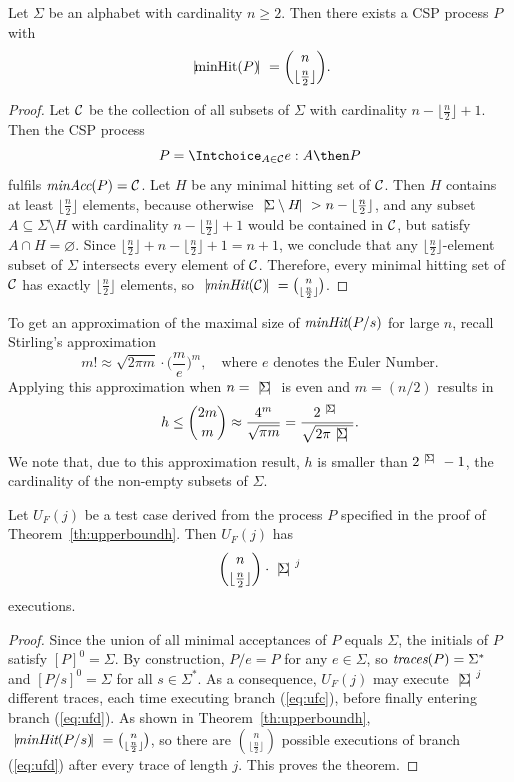 \begin{theorem}
\label{th:upperboundh}
Let  $\Sigma$  be an alphabet with cardinality $n\ge 2$.  Then
there exists a CSP process $P$ with
\[
{~|\! \text{minHit}(P)\!|~} = \binom{n}{\lfloor\frac{n}{2}\rfloor}.
\]
\end{theorem}
\begin{proof}
Let ${\cal C}$ be the collection of all subsets of $\Sigma$ with cardinality
$n-\lfloor{\frac{n}{2}}\rfloor+1$. Then the CSP process
\[
P = \Intchoice_{A\in {\cal C}} e:A\then P
\]
fulfils $\text{\it minAcc}(P) = {\cal C}$. Let $H$ be any minimal hitting set of ${\cal C}$. Then
$H$ contains at least $\lfloor{\frac{n}{2}}\rfloor$ elements, because
otherwise ${~|\! \Sigma\setminus H\!|~} > n-\lfloor{\frac{n}{2}}\rfloor$, and any
subset $A\subseteq \Sigma\setminus H$ with cardinality
$n-\lfloor{\frac{n}{2}}\rfloor+1$  would be contained in ${\cal C}$, but satisfy
$A\cap H=\varnothing$. Since
$\lfloor{\frac{n}{2}}\rfloor+n-\lfloor{\frac{n}{2}}\rfloor+1=n+1$, we
conclude
 that any $\lfloor{\frac{n}{2}}\rfloor$-element subset of $\Sigma$
 intersects  every element of ${\cal C}$.  Therefore, every minimal hitting set of ${\cal C}$ has exactly $\lfloor{\frac{n}{2}}\rfloor$ elements,
so ${~|\! \text{\it minHit}({\cal C})\!|~} = \binom{n}{\lfloor{\frac{n}{2}}\rfloor}$.
\xbox
\end{proof}
%
To get an approximation of the maximal size of $\text{\it minHit}(P/s)$ for large $n$,
recall Stirling's approximation~\cite[p.~112]{Graham:1994:CMF:562056}
\[
m! \approx \sqrt{2\pi m} \cdot \big( \frac{m}{e} \big)^m, \quad\text{where $e$ denotes the Euler Number.}
\]
Applying this approximation when $n = {~|\! \Sigma\!|~}$ is even and $m = (n/2)$
results in
\[
h \le \binom{2m}{m} \approx \frac{4^m}{\sqrt{\pi m}} =
\frac{2^{~|\! \Sigma\!|~}}{\sqrt{2\pi {~|\! \Sigma\!|~}}}.
\]
%
We note that, due to this approximation result,
$h$ is   smaller than $2^{{~|\! \Sigma\!|~}}-1$, the cardinality of the
non-empty subsets of $\Sigma$.

\begin{theorem}\label{th:numexecP}
Let $U_F(j)$ be a test case derived from the 
process $P$ specified in the proof of Theorem~\ref{th:upperboundh}. Then
$U_F(j)$ has
\[
\binom{n}{\lfloor\frac{n}{2}\rfloor}\cdot {~|\! \Sigma\!|~}^j
\]
executions.
\end{theorem}
\begin{proof}
Since the union of all minimal acceptances of $P$ equals $\Sigma$, 
the initials of $P$ satisfy $[P]^0 = \Sigma$. By construction, $P/e = P$
for any $e\in\Sigma$, so $\text{\it traces}(P) = \Sigma^*$ and $[P/s]^0 = \Sigma$
for all $s\in\Sigma^*$. As a consequence, $U_F(j)$
may execute ${~|\! \Sigma\!|~}^j$ different traces, each time executing branch (\ref{eq:ufc}),
before finally entering branch (\ref{eq:ufd}). As shown in Theorem~\ref{th:upperboundh},
${~|\! \text{\it minHit}(P/s)\!|~} =  \binom{n}{\lfloor\frac{n}{2}\rfloor}$, so there are
$\binom{n}{\lfloor\frac{n}{2}\rfloor}$ possible executions of branch (\ref{eq:ufd})
after every trace of length $j$. This proves the theorem.
\xbox
\end{proof}

